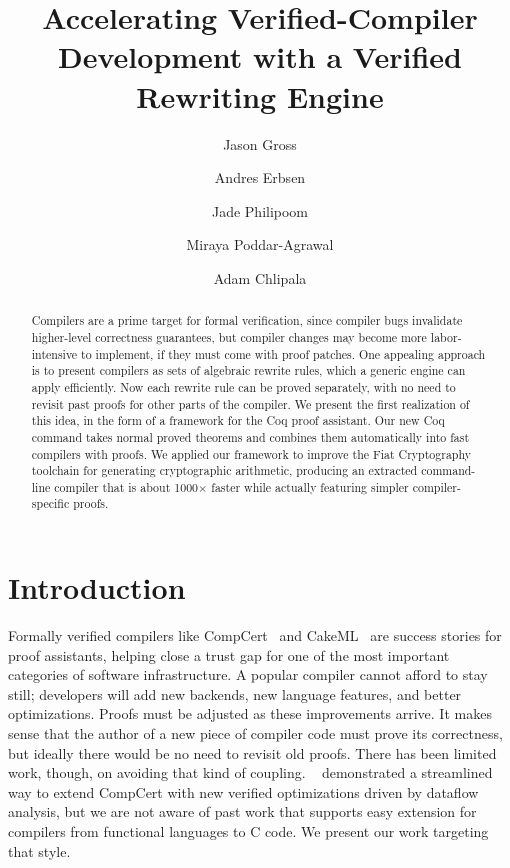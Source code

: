 \documentclass[a4paper,USenglish,cleveref,autoref,thm-restate]{lipics-v2021}
\title{Accelerating Verified-Compiler Development with a Verified Rewriting Engine}
\author{Jason Gross}{CSAIL, Massachusetts Institute of Technology, 77 Massachusetts Ave., Cambridge, MA 02139, USA \and MIRI, USA \and \url{https://jasongross.github.io/} }{jgross@mit.edu}{https://orcid.org/0000-0002-9427-4891}{}%
\author{Andres Erbsen}{CSAIL, Massachusetts Institute of Technology, 77 Massachusetts Ave., Cambridge, MA 02139, USA \and \url{https://andres.systems/} }{andreser@mit.edu}{}{}
\author{Jade Philipoom%
}{CSAIL, Massachusetts Institute of Technology, 77 Massachusetts Ave., Cambridge, MA 02139, USA \and Google}{jade.philipoom@gmail.com}{}{}
\author{Miraya Poddar-Agrawal}{Reed College, 3203 SE Woodstock Blvd, Portland, OR 97202, USA%
}{ragrawal@reed.edu}{https://orcid.org/0000-0001-7617-9180}{}
\author{Adam Chlipala}{CSAIL, Massachusetts Institute of Technology, 77 Massachusetts Ave., Cambridge, MA 02139, USA \and \url{http://adam.chlipala.net/} }{adamc@csail.mit.edu}{https://orcid.org/0000-0001-7085-9417}{%
}
\newcommand{\citet}[1]{\usebibentry{#1}{citet}~\cite{#1}}
\begin{document}
\maketitle

\begin{abstract}
  Compilers are a prime target for formal verification, since compiler bugs invalidate higher-level correctness guarantees, but compiler changes may become more labor-intensive to implement, if they must come with proof patches.
  One appealing approach is to present compilers as sets of algebraic rewrite rules, which a generic engine can apply efficiently.
  Now each rewrite rule can be proved separately, with no need to revisit past proofs for other parts of the compiler.
  We present the first realization of this idea, in the form of a framework for the Coq proof assistant.
  Our new Coq command takes normal proved theorems and combines them automatically into fast compilers with proofs.
  We applied our framework to improve the Fiat Cryptography toolchain for generating cryptographic arithmetic, producing an extracted command-line compiler that is about 1000$\times$ faster while actually featuring simpler compiler-specific proofs.
\end{abstract}

\section{Introduction}\label{sec:intro}

Formally verified compilers like CompCert~\cite{Compcert} and CakeML~\cite{CakeML} are success stories for proof assistants, helping close a trust gap for one of the most important categories of software infrastructure.
A popular compiler cannot afford to stay still; developers will add new backends, new language features, and better optimizations.
Proofs must be adjusted as these improvements arrive.
It makes sense that the author of a new piece of compiler code must prove its correctness, but ideally there would be no need to revisit old proofs.
There has been limited work, though, on avoiding that kind of coupling.
\citet{xcert} demonstrated a streamlined way to extend CompCert with new verified optimizations driven by dataflow analysis, but we are not aware of past work that supports easy extension for compilers from functional languages to C code.
We present our work targeting that style.
\end{document}

